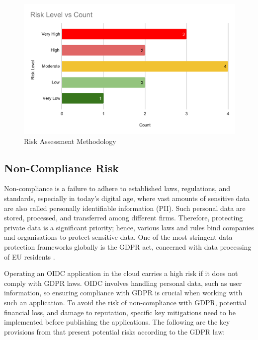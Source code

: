 \begin{figure}[h!]
\centering
\includegraphics[width=\textwidth]{pics/risk_level_vs_count.pdf}
\caption{Risk Assessment Methodology}\label{fig:Risk Level Counts}
\end{figure}

\subsection{Non-Compliance Risk}
Non-compliance is a failure to adhere to established laws, regulations, and standards, especially in today's digital age, where vast amounts of sensitive data are also called personally identifiable information (PII). Such personal data are stored, processed, and transferred among different firms. Therefore, protecting private data is a significant priority; hence, various laws and rules bind companies and organisations to protect sensitive data. One of the most stringent data protection frameworks globally is the GDPR act, concerned with data processing of EU residents \citep{gdpr_stringent}. 

Operating an OIDC application in the cloud carries a high risk if it does not comply with GDPR laws. OIDC involves handling personal data, such as user information, so ensuring compliance with GDPR is crucial when working with such an application. To avoid the risk of non-compliance with GDPR, potential financial loss, and damage to reputation, specific key mitigations need to be implemented before publishing the applications. The following are the key provisions from \citep{gdpr_law} that present potential risks according to the GDPR law:


